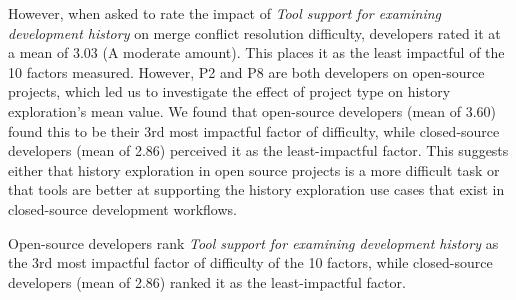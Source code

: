 However, when asked to rate the impact of \textit{Tool support for examining development history} on merge conflict resolution difficulty, developers rated it at a mean of 3.03 (A moderate amount). This places it as the least impactful of the 10 factors measured. However, P2 and P8 are both developers on open-source projects, which led us to investigate the effect of project type on history exploration's mean value. We found that open-source developers (mean of 3.60) found this to be their 3rd most impactful factor of difficulty, while closed-source developers (mean of 2.86) perceived it as the least-impactful factor. This suggests either that history exploration in open source projects is a more difficult task or that tools are better at supporting the history exploration use cases that exist in closed-source development workflows.
\begin{tcolorbox}[enhanced,minipage boxed title,enhanced,title={Takeaway \arabic{takeawaycounter}},
attach boxed title to top left=
{xshift=0mm,yshift=-1mm},
boxed title style={size=small}]
Open-source developers rank \textit{Tool support for examining development history} as the 3rd most impactful factor of difficulty of the 10 factors, while closed-source developers (mean of 2.86) ranked it as the least-impactful factor.
\end{tcolorbox}
\addtocounter{takeawaycounter}{1}

